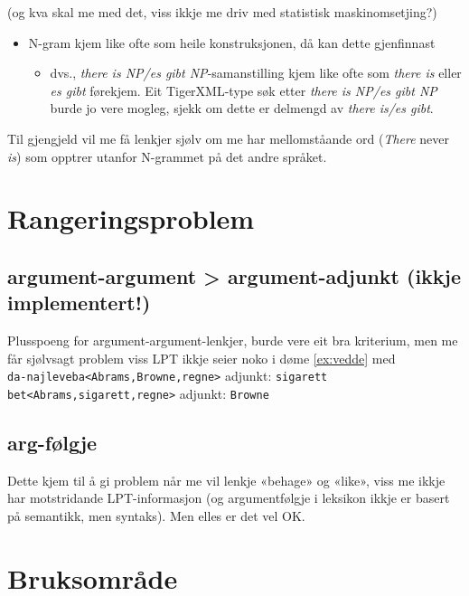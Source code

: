 \documentclass[11pt,a4paper,oneside,draft]{book}
\begin{document}
(og kva skal me med det, viss ikkje me driv med statistisk
maskinomsetjing?)

\begin{itemize}
\item N-gram kjem like ofte som heile konstruksjonen, då kan dette
  gjenfinnast

\begin{itemize}
\item dvs., \emph{there is NP/es gibt NP}-samanstilling kjem like ofte som
    \emph{there is} eller \emph{es gibt} førekjem. Eit TigerXML-type søk etter
    \emph{there is NP/es gibt NP} burde jo vere mogleg, sjekk om dette er
    delmengd av \emph{there is/es gibt}.
\end{itemize}

\end{itemize}
Til gjengjeld vil me få lenkjer sjølv om me har mellomståande ord
(\emph{There} never \emph{is}) som opptrer utanfor N-grammet på det andre
språket.



\section{Rangeringsproblem}
\label{sec-5.3}

\subsection{argument-argument > argument-adjunkt (ikkje implementert!)}
\label{sec-5.3.1}

    Plusspoeng for argument-argument-lenkjer, burde vere eit bra
    kriterium, men me får sjølvsagt problem viss LPT ikkje seier noko
    i døme \ref{ex:vedde} med \\
    \texttt{da-najleveba<Abrams,Browne,regne>} adjunkt: \texttt{sigarett}\\
    \texttt{bet<Abrams,sigarett,regne>} adjunkt: \texttt{Browne}
    
\subsection{arg-følgje}
\label{sec-5.3.2}

    Dette kjem til å gi problem når me vil lenkje «behage» og «like»,
    viss me ikkje har motstridande LPT-informasjon (og argumentfølgje
    i leksikon ikkje er basert på semantikk, men syntaks). Men elles
    er det vel OK.
\section{Bruksområde}
\label{sec-5.4}
\end{document}
